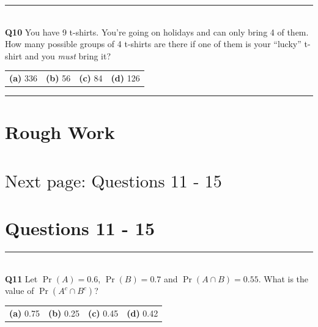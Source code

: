 \documentclass[12pt]{article}
\begin{document}
\rule{\linewidth}{1pt}
\quad\\
{\bf Q10} You have 9 t-shirts. You're going on holidays and can only bring 4 of them. How many possible groups of 4 t-shirts are there if one of them is your ``lucky'' t-shirt and you \emph{must} bring it?\\[0.2cm]
\begin{tabular}{cccc}
{\bf(a)} 336 & {\bf(b)} 56 & {\bf(c)} 84 & {\bf(d)} 126  \\[0.6cm]
\end{tabular}

\rule{\linewidth}{1pt}

\newpage

\section*{Rough Work\\[23cm]}
\section*{\hspace{8cm}$\boxed{\text{Next page: Questions 11 - 15}}$}

\newpage

\section*{Questions 11 - 15}


\rule{\linewidth}{1pt}
\quad\\
{\bf Q11} Let $\Pr(A) = 0.6$, $\Pr(B) = 0.7$ and $\Pr(A \cap B) = 0.55$. What is the value of $\Pr(A^c \cap B^c)$? \\[0.2cm]
\begin{tabular}{cccc}
{\bf(a)} 0.75 & {\bf(b)} 0.25  & {\bf(c)} 0.45  & {\bf(d)} 0.42 \\[0.6cm]
\end{tabular}
\end{document}
